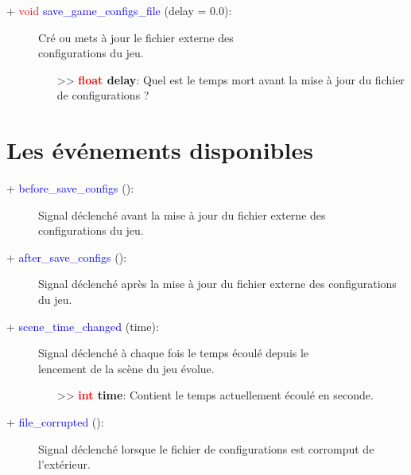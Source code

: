 \documentclass[a4paper, 11pt]{article}
\begin{document}
	\begin{description}
		\item [+ \textcolor{red}{void} \textcolor{blue}{save\_game\_configs\_file} (delay = 0.0):] Cré ou 
		mets à jour le fichier externe des \\configurations du jeu.
		\begin{itemize}
			\item [>> \textbf{\textcolor{red}{float} delay}:] Quel est le temps mort avant la mise à jour du
			fichier de configurations ?\\
		\end{itemize}
	\end{description}

	\section{Les événements disponibles}
	\begin{description}
		\item [+ \textcolor{blue}{before\_save\_configs} ():] Signal déclenché avant la mise à jour du 
		fichier externe des \\configurations du jeu.\\
	\end{description}
	\begin{description}
		\item [+ \textcolor{blue}{after\_save\_configs} ():] Signal déclenché après la mise à jour du 
		fichier externe des configurations du jeu.\\
	\end{description}
	\newpage \begin{description}
		\item [+ \textcolor{blue}{scene\_time\_changed} (time):] Signal déclenché à chaque fois le temps 
		écoulé depuis le \\lencement de la scène du jeu évolue.
		\begin{itemize}
			\item [>> \textbf{\textcolor{red}{int} time}:] Contient le temps actuellement écoulé en seconde.
			\\
		\end{itemize}
	\end{description}
	\begin{description}
		\item [+ \textcolor{blue}{file\_corrupted} ():] Signal déclenché lorsque le fichier de
		configurations est corromput de \\l'extérieur.\\
	\end{description}
\end{document}
